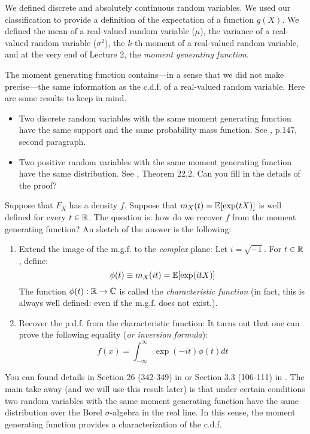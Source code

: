 \documentclass[11pt]{article} %
\begin{document}
We defined discrete and absolutely continuous random variables. We used our classification to provide a definition of the expectation of a function $g(X)$. We defined the mean of a real-valued random variable ($\mu$), the variance of a real-valued random variable ($\sigma^2$), the $k$-th moment of a real-valued random variable, and at the very end of Lecture 2, the \emph{moment generating function}. 

The moment generating function contains---in a sense that we did not make precise---the same information as the c.d.f. of a real-valued random variable. Here are some results to keep in mind. 

\begin{itemize}
\item Two discrete random variables with the same moment generating function have the same support and the same probability mass function. See \cite{Billingsley95}, p.147, second paragraph.
\item Two positive random variables with the same moment generating function have the same distribution. See \cite{Billingsley95}, Theorem 22.2. Can you fill in the details of the proof? 
\end{itemize}

 Suppose that $F_{X}$ has a density $f$. Suppose that $m_{X}(t)=\mathbb{E}[\exp(tX)]$ is well defined for every $t \in \mathbb{R}$. The question is: how do we recover $f$ from the moment generating function? An sketch of the answer is the following:

\begin{enumerate}
\item Extend the image of the m.g.f. to the \emph{complex} plane: Let $i=\sqrt{-1}$. For $t \in \mathbb{R}$, define:
$$\phi(t)\equiv m_{X}(it)=\mathbb{E}[\exp(itX)] $$ 
\noindent The function $\phi(t):\mathbb{R} \rightarrow \mathbb{C}$ is called the \emph{characteristic function} (in fact, this is always well defined: even if the m.g.f. does not exist.).
\item Recover the p.d.f. from the characteristic function: It turns out that one can prove the following equality (\emph{or inversion formula}):
$$f(x) = \int_{-\infty}^{\infty} \exp(-it) \phi(t) dt $$
\end{enumerate}

You can found details in Section 26 (342-349) in \cite{Billingsley95} or Section 3.3 (106-111) in \cite{durrett2010}. The main take away (and we will use this result later) is that under certain conditions two random variables with the same moment generating function have the same distribution over the Borel $\sigma$-algebra in the real line. In this sense, the moment generating function provides a characterization of the c.d.f.  

\newpage



\end{document}
